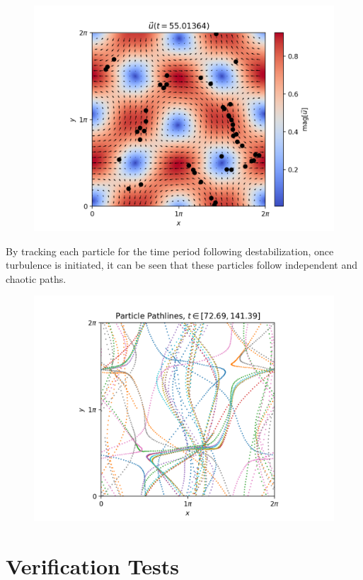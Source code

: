 \documentclass[12pt, reqno]{amsart}
\begin{document}
\begin{figure}[H]
    \centering
    \includegraphics[width = 1\linewidth]{Vorticity-Steamfunction.png}
\end{figure}

By tracking each particle for the time period following destabilization, once turbulence is initiated, it can be seen that these particles follow independent and chaotic paths.

\begin{figure}[H]
    \centering
    \includegraphics[width = 1\linewidth]{Particle Pathlines.png}
\end{figure}



\section{Verification Tests}
\end{document}
